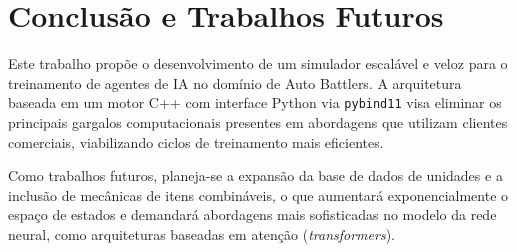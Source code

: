 \documentclass[12pt]{article}
\begin{document}
\section{Conclusão e Trabalhos Futuros} \label{sec:conclusao}

Este trabalho propõe o desenvolvimento de um simulador escalável e veloz para o treinamento de agentes de IA no domínio de Auto Battlers. A arquitetura baseada em um motor C++ com interface Python via \texttt{pybind11} visa eliminar os principais gargalos computacionais presentes em abordagens que utilizam clientes comerciais, viabilizando ciclos de treinamento mais eficientes.

Como trabalhos futuros, planeja-se a expansão da base de dados de unidades e a inclusão de mecânicas de itens combináveis, o que aumentará exponencialmente o espaço de estados e demandará abordagens mais sofisticadas no modelo da rede neural, como arquiteturas baseadas em atenção (\textit{transformers}).



\end{document}
